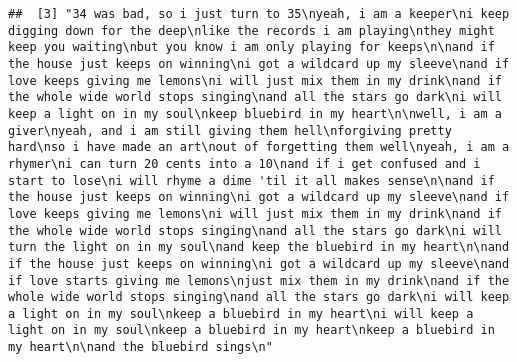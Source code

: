 \documentclass[]{article}
\begin{document}
\begin{verbatim}
##  [3] "34 was bad, so i just turn to 35\nyeah, i am a keeper\ni keep digging down for the deep\nlike the records i am playing\nthey might keep you waiting\nbut you know i am only playing for keeps\n\nand if the house just keeps on winning\ni got a wildcard up my sleeve\nand if love keeps giving me lemons\ni will just mix them in my drink\nand if the whole wide world stops singing\nand all the stars go dark\ni will keep a light on in my soul\nkeep bluebird in my heart\n\nwell, i am a giver\nyeah, and i am still giving them hell\nforgiving pretty hard\nso i have made an art\nout of forgetting them well\nyeah, i am a rhymer\ni can turn 20 cents into a 10\nand if i get confused and i start to lose\ni will rhyme a dime 'til it all makes sense\n\nand if the house just keeps on winning\ni got a wildcard up my sleeve\nand if love keeps giving me lemons\ni will just mix them in my drink\nand if the whole wide world stops singing\nand all the stars go dark\ni will turn the light on in my soul\nand keep the bluebird in my heart\n\nand if the house just keeps on winning\ni got a wildcard up my sleeve\nand if love starts giving me lemons\njust mix them in my drink\nand if the whole wide world stops singing\nand all the stars go dark\ni will keep a light on in my soul\nkeep a bluebird in my heart\ni will keep a light on in my soul\nkeep a bluebird in my heart\nkeep a bluebird in my heart\n\nand the bluebird sings\n"                                                                                                                                                                                                                                                                                                                                                                                                                                                                                                                                                                                                                                                                                                                                                                                                                                                                                                                                                                                                                                                                                                                                                                                                                                                                                                                                                                                                                                                                                                        

\end{verbatim}
\end{document}
